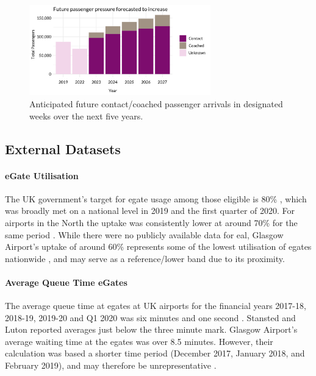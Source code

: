\documentclass[10pt]{article}
\begin{document}
\begin{figure}[!ht]
    \centering
    \includegraphics[width=0.7\textwidth]{figures/future_passenger_burden_fig.png}
     \caption{Anticipated future contact/coached passenger arrivals in designated weeks over the next five years.  } \label{fig:future_passenger_burden}
\end{figure}

\subsection{External Datasets}

\paragraph{eGate Utilisation}
The UK government's target for \gls{egate} usage among those eligible is 80\% \cite{UK_border_2025}, which was broadly met on a national level in 2019 and the first quarter of 2020. For airports in the North the uptake was consistently lower at around 70\% for the same period \cite{Inspection_eGates}. While there were no publicly available data for \gls{eal}, Glasgow Airport's uptake of around 60\% represents some of the lowest utilisation of \glspl{egate} nationwide \cite{Inspection_eGates}, and may serve as a reference/lower band due to its proximity.

\paragraph{Average Queue Time eGates}
The average queue time at \glspl{egate} at UK airports for the financial years 2017-18, 2018-19, 2019-20 and Q1 2020 was six minutes and one second \cite{Inspection_eGates}. Stansted and Luton reported averages just below the three minute mark. Glasgow Airport's average waiting time at the \glspl{egate} was over 8.5 minutes. However, their calculation was based a shorter time period (December 2017, January 2018, and February 2019), and may therefore be unrepresentative \cite{Inspection_eGates}.
\end{document}
